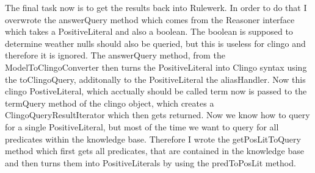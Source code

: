 \documentclass[hyperref, bachelorofscience]{cgvpub}
\begin{document}
The final task now is to get the results back into Rulewerk. In order to do that I overwrote the answerQuery method which comes from the Reasoner interface which takes a PositiveLiteral and also a boolean. The boolean is supposed to determine weather nulls should also be queried, but this is useless for clingo and therefore it is ignored. The answerQuery method, from the ModelToClingoConverter then turns the PositiveLiteral into Clingo syntax using the toClingoQuery, additonally to the PositiveLiteral the aliasHandler. Now this clingo PostiveLiteral, which acctually should be called term now is passed to the termQuery method of the clingo object, which creates a ClingoQueryResultIterator which then gets returned. Now we know how to query for a single PositiveLiteral, but most of the time we want to query for all predicates within the knowledge base. Therefore I wrote the getPosLitToQuery method which first gets all predicates, that are contained in the knowledge base and then turns them into PositiveLiterals by using the predToPosLit method.
\end{document}
